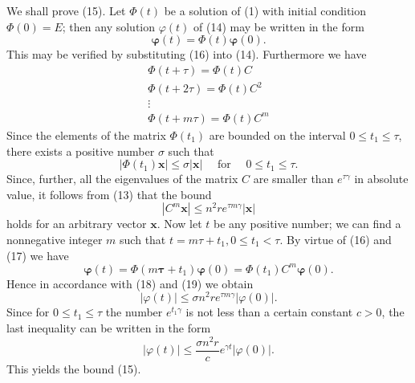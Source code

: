 \documentclass[10pt,a5paper]{book}
\theoremstyle{plain}
\theoremstyle{definition}
\theoremstyle{remark}
\begin{document}
We shall prove (15). Let $\Phi(t)$ be a solution of (1) with initial condition $\Phi(0)=E$; then any solution $\varphi(t)$ of (14) may be written in the form
\begin{equation*}
\boldsymbol{\varphi}(t)=\Phi(t) \boldsymbol{\varphi}(0) . \tag{16}
\end{equation*}
This may be verified by substituting (16) into (14). Furthermore we have
\begin{gather*}
\Phi(t+\tau)=\Phi(t) C \\
\Phi(t+2 \tau)=\Phi(t) C^{2} \\
\vdots \\
\Phi(t+m \tau)=\Phi(t) C^{m} \tag{17}
\end{gather*}
Since the elements of the matrix $\Phi\left(t_{1}\right)$ are bounded on the interval $0 \leq t_{1} \leq \tau$, there exists a positive number $\sigma$ such that
\begin{equation*}
\left|\Phi\left(t_{1}\right) \mathbf{x}\right| \leq \sigma|\mathbf{x}| \quad \text { for } \quad 0 \leq t_{1} \leq \tau . \tag{18}
\end{equation*}
Since, further, all the eigenvalues of the matrix $C$ are smaller than $e^{\tau \gamma}$ in absolute value, it follows from (13) that the bound
\begin{equation*}
\left|C^{m} \mathbf{x}\right| \leq n^{2} r e^{\tau m \gamma}|\mathbf{x}| \tag{19}
\end{equation*}
holds for an arbitrary vector $\mathbf{x}$. Now let $t$ be any positive number; we can find a nonnegative integer $m$ such that $t=m \tau+t_{1}, 0 \leq t_{1}<\tau$. By virtue of (16) and (17) we have
\[
\boldsymbol{\varphi}(t)=\Phi\left(m \boldsymbol{\tau}+t_{1}\right) \boldsymbol{\varphi}(0)=\Phi\left(t_{1}\right) C^{m} \boldsymbol{\varphi}(0) .
\]
Hence in accordance with (18) and (19) we obtain
\[
|\varphi(t)| \leq \sigma n^{2} r e^{\tau m \gamma}|\varphi(0)| .
\]
Since for $0 \leq t_{1} \leq \tau$ the number $e^{t_{1} \gamma}$ is not less than a certain constant $c>0$, the last inequality can be written in the form
\[
|\varphi(t)| \leq \frac{\sigma n^{2} r}{c} e^{\gamma t}|\varphi(0)| .
\]
This yields the bound (15).
\end{document}
